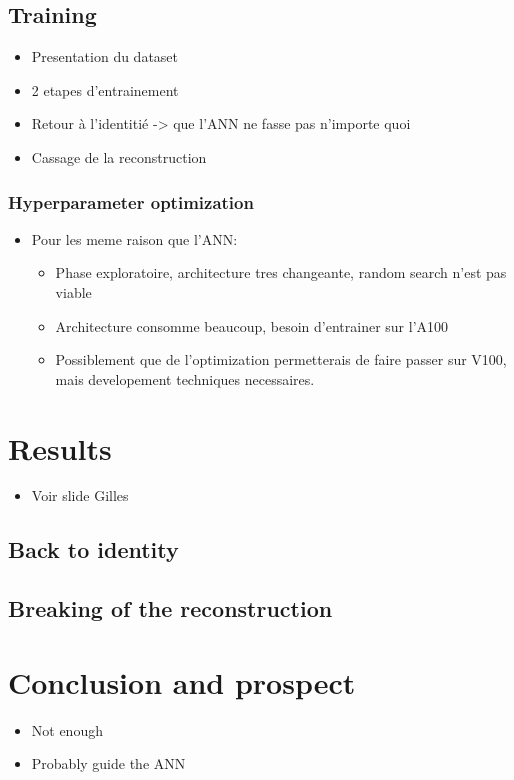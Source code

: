 \documentclass[../main.tex]{subfiles}
\begin{document}
\subsection{Training}
\label{sec:janne:arch:training}
\begin{itemize}
  \item Presentation du dataset
  \item 2 etapes d'entrainement
  \item Retour à l'identitié -> que l'ANN ne fasse pas n'importe quoi
  \item Cassage de la reconstruction
\end{itemize}

\subsubsection{Hyperparameter optimization}
\label{sec:janne:arch:hyper}
\begin{itemize}
  \item Pour les meme raison que l'ANN:
    \begin{itemize}
      \item Phase exploratoire, architecture tres changeante, random search n'est pas viable
      \item Architecture consomme beaucoup, besoin d'entrainer sur l'A100
      \item Possiblement que de l'optimization permetterais de faire passer sur V100, mais developement techniques necessaires.
    \end{itemize}
\end{itemize}

\section{Results}
\label{sec:janne:results}

\begin{itemize}
  \item Voir slide Gilles
\end{itemize}

\subsection{Back to identity}
\label{sec:janne:results:identity}

\subsection{Breaking of the reconstruction}
\label{sec:janne:results:break}

\section{Conclusion and prospect}
\label{sec:janne:conclusion}
\begin{itemize}
  \item Not enough
  \item Probably guide the ANN
\end{itemize}
\end{document}

